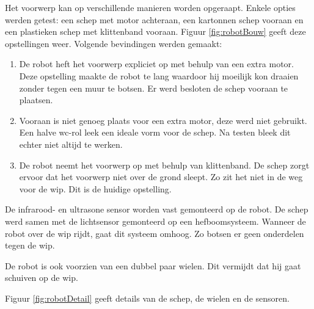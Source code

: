 \documentclass[tt2]{penoverslag}
\begin{document}
Het voorwerp kan op verschillende manieren worden opgeraapt. Enkele opties werden getest: een schep met motor achteraan, een kartonnen schep vooraan en een plastieken schep met klittenband vooraan. Figuur \ref{fig:robotBouw} geeft deze opstellingen weer. Volgende bevindingen werden gemaakt:

\begin{enumerate}
\item De robot heft het voorwerp expliciet op met behulp van een extra motor. Deze opstelling maakte de robot te lang waardoor hij moeilijk kon draaien zonder tegen een muur te botsen. Er werd besloten de schep vooraan te plaatsen.
\item Vooraan is niet genoeg plaats voor een extra motor, deze werd niet gebruikt. Een halve wc-rol leek een ideale vorm voor de schep. Na testen bleek dit echter niet altijd te werken.
\item De robot neemt het voorwerp op met behulp van klittenband. De schep zorgt ervoor dat het voorwerp niet over de grond sleept. Zo zit het niet in de weg voor de wip. Dit is de huidige opstelling.
\end{enumerate}

De infrarood- en ultrasone sensor worden vast gemonteerd op de robot.
De schep werd samen met de lichtsensor gemonteerd op een hefboomsysteem. Wanneer de robot over de wip rijdt, gaat dit systeem omhoog. Zo botsen er geen onderdelen tegen de wip.

De robot is ook voorzien van een dubbel paar wielen. Dit vermijdt dat hij gaat schuiven op de wip.

Figuur \ref{fig:robotDetail} geeft details van de schep, de wielen en de sensoren.
\end{document}
